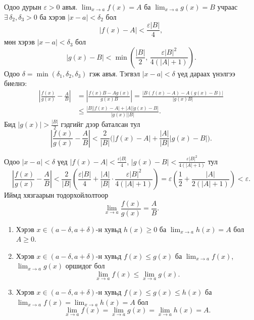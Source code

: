 \begin{prof}
Одоо дурын $\varepsilon>0$ авъя.  
$\displaystyle\lim_{x\to a}f(x)=A$ ба $\displaystyle\lim_{x\to a}g(x)=B$ учраас $\exists\,\delta_2,\delta_3>0$ ба хэрэв $|x-a|<\delta_2$ бол
\[
|f(x)-A|<\frac{\varepsilon |B|}{4},
\]
мөн хэрэв $|x-a|<\delta_3$ бол
\[
|g(x)-B|<\min\left(\frac{|B|}{2},\,\frac{\varepsilon |B|^2}{4(|A|+1)}\right).
\]
Одоо $\delta=\min(\delta_1,\delta_2,\delta_3)$ гэж авъя. Тэгвэл $|x-a|<\delta$ үед дараах үнэлгээ биелнэ:
\begin{align*}
\left|\frac{f(x)}{g(x)}-\frac{A}{B}\right|
&=\left|\frac{f(x)B-A g(x)}{g(x)B}\right|
=\frac{|B(f(x)-A)-A(g(x)-B)|}{|g(x)B|}\\[4pt]
&\le \frac{|B||f(x)-A|+|A||g(x)-B|}{|g(x)||B|}.
\end{align*}
Бид $|g(x)|>\frac{|B|}{2}$ гэдгийг дээр баталсан тул
\[
\left|\frac{f(x)}{g(x)}-\frac{A}{B}\right|
<\frac{2}{|B|}\Big(|f(x)-A|+\frac{|A|}{|B|}|g(x)-B|\Big).
\]

Одоо $|x-a|<\delta$ үед $|f(x)-A|<\frac{\varepsilon |B|}{4}$, $|g(x)-B|<\frac{\varepsilon |B|^2}{4(|A|+1)}$ тул
\[
\left|\frac{f(x)}{g(x)}-\frac{A}{B}\right|
<\frac{2}{|B|}\!\left(\frac{\varepsilon |B|}{4}+\frac{|A|}{|B|}\cdot\frac{\varepsilon |B|^2}{4(|A|+1)}\right)
=\varepsilon\left(\frac12+\frac{|A|}{2(|A|+1)}\right)
<\varepsilon.
\]
Иймд хязгаарын тодорхойлолтоор
\[
\lim_{x\to a}\frac{f(x)}{g(x)}=\frac{A}{B}.
\]
\end{prof}

\begin{theorem}\label{ineqlim}
\begin{enumerate}[label=(\arabic*)]
\item Хэрэв $x\in (a-\delta,a+\delta)$-н хувьд $h(x)\ge 0$ ба $\lim_{x\to a} h(x)=A$ бол $A\ge 0$.
\item Хэрэв $x\in (a-\delta,a+\delta)$-н хувьд $f(x)\le g(x)$ ба $\lim_{x\to a} f(x)$, $\lim_{x\to a} g(x)$ оршидог бол 
\[
\lim_{x\to a} f(x)\le \lim_{x\to a} g(x).
\]
\item Хэрэв $x\in (a-\delta,a+\delta)$-н хувьд $f(x)\le g(x)\le h(x)$ ба $\lim_{x\to a} f(x)=\lim_{x\to a} h(x)=A$ бол
\[
\lim_{x\to a} f(x)=\lim_{x\to a} g(x)=\lim_{x\to a} h(x)=A.
\]
\end{enumerate}
\end{theorem}

